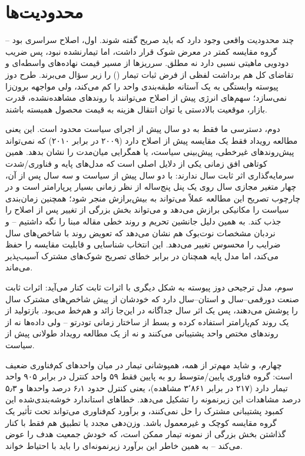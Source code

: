 \documentclass[11pt]{article}
\begin{document}
\section{محدودیت‌ها}

چند محدودیت واقعی وجود دارد که باید صریح گفته شوند. اول، اصلاح سراسری بود -- گروه مقایسه کمتر در معرض شوک قرار داشت، اما تیمارنشده نبود، پس ضریب دودویی ماهیتی نسبی دارد نه مطلق. سرریزها از مسیر قیمت نهاده‌های واسطه‌ای و تقاضای کل هم برداشت لفظی از فرض ثبات تیمار () را زیر سؤال می‌برند. طرح دوز پیوسته وابستگی به یک آستانه طبقه‌بندی واحد را کم می‌کند، ولی مواجهه برون‌زا نمی‌سازد؛ سهم‌های انرژی پیش از اصلاح می‌توانند با روندهای مشاهده‌نشده، قدرت بازار، موقعیت بالادستی یا توان انتقال هزینه به قیمت محصول همبسته باشند.

دوم، دسترسی ما فقط به دو سال پیش از اجرای سیاست محدود است. این یعنی مطالعه رویداد فقط یک مقایسه پیش از اصلاح دارد (۲۰۰۹ در برابر ۲۰۱۰) که نمی‌تواند پیش‌روندهای غیرخطی، پیش‌بینی سیاست، یا همگرایی میان‌مدت را نشان بدهد. همین کوتاهی افق زمانی یکی از دلایل اصلی است که مدل‌های پایه و فناوری/شدت سرمایه‌گذاری اثر ثابت سال ندارند: با دو سال پیش از سیاست و سه سال پس از آن، چهار متغیر مجازی سال روی یک پنل پنج‌ساله از نظر زمانی بسیار پرپارامتر است و در چارچوب تصریح این مطالعه عملاً می‌تواند به بیش‌برازش منجر شود؛ همچنین زمان‌بندی سیاست را مکانیکی برازش می‌دهد و می‌تواند بخش بزرگی از تغییر پس از اصلاح را جذب کند. به همین دلیل جانشین تحریم و روند خطی مقاله مبنا را نگه داشتیم -- و نردبان مشخصات نوت‌بوک هم نشان می‌دهد که تعویض روند با شاخص‌های سال ضرایب را محسوس تغییر می‌دهد. این انتخاب شناسایی و قابلیت مقایسه را حفظ می‌کند، اما مدل پایه همچنان در برابر خطای تصریح شوک‌های مشترک آسیب‌پذیر می‌ماند.

سوم، مدل ترجیحی دوز پیوسته به شکل دیگری با اثرات ثابت کنار می‌آید: اثرات ثابت صنعت دورقمی--سال و استان--سال دارد که خودشان از پیش شاخص‌های مشترک سال را پوشش می‌دهند، پس یک اثر سال جداگانه در این‌جا زائد و هم‌خط می‌بود. بازتولید از یک روند کم‌پارامتر استفاده کرده و بسط از ساختار زمانی تودرتو -- ولی داده‌ها نه از روندهای مختص واحد پشتیبانی می‌کنند و نه از یک مطالعه رویداد طولانی پیش از سیاست.

چهارم، و شاید مهم‌تر از همه، همپوشانی تیمار در میان واحدهای کم‌فناوری ضعیف است: گروه فناوری پایین/متوسط رو به پایین فقط ۵۹ واحد کنترل در برابر ۹۰۵ واحد تیمار دارد (۲۱۷ در برابر ۳٬۸۶۱ مشاهده)، یعنی کنترل حدود ۶٫۱ درصد واحدها و ۵٫۳ درصد مشاهدات این زیرنمونه را تشکیل می‌دهد. خطاهای استاندارد خوشه‌بندی‌شده این کمبود پشتیبانی مشترک را حل نمی‌کنند، و برآورد کم‌فناوری می‌تواند تحت تأثیر یک گروه مقایسه کوچک و غیرمعمول باشد. وزن‌دهی مجدد یا تطبیق هم فقط با کنار گذاشتن بخش بزرگی از نمونه تیمار ممکن است، که خودش جمعیت هدف را عوض می‌کند -- به همین خاطر این برآورد زیرنمونه‌ای را باید با احتیاط خواند.
\end{document}
